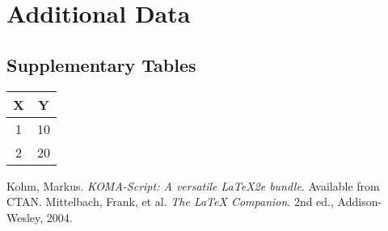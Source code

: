 \documentclass[
    a4paper,            %
    11pt,               %
    DIV=12,             %
    BCOR=5mm,           %
    twoside,            %
    headings=normal,    %
    toc=bibliography,   %
    toc=listof,         %
    listof=totoc,       %
    parskip=half,       %
    captions=tableheading, %
    numbers=autoendperiod, %
    appendixprefix=true,%
    chapterprefix=true, %
]{scrreprt}
\begin{document}

\appendix
\chapter{Additional Data}
\section{Supplementary Tables}
\lipsum[17]
\begin{table}[hbtp]
  \centering
  \begin{tabular}{cc}
    \toprule
    X & Y  \\
    \midrule
    1 & 10 \\
    2 & 20 \\
    \bottomrule
  \end{tabular}
\end{table}

\clearpage %
\begin{thebibliography}{9}
   Kohm, Markus. \textit{KOMA-Script: A versatile LaTeX2e bundle}. Available from CTAN\@.
   Mittelbach, Frank, et al. \textit{The LaTeX Companion}. 2nd ed., Addison-Wesley, 2004.
\end{thebibliography}

\clearpage
\printindex
\end{document}
